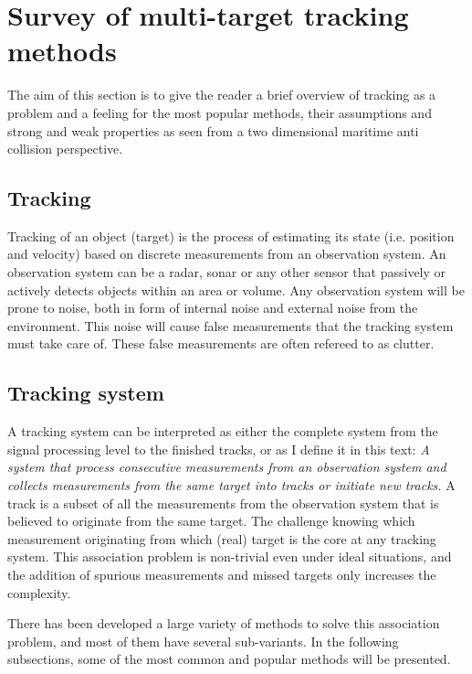 
\section{Survey of multi-target tracking methods}
\label{sec:survey}
The aim of this section is to give the reader a brief overview of tracking as a problem and a feeling for the most popular methods, their assumptions and strong and weak properties as seen from a two dimensional maritime anti collision perspective.

\subsection{Tracking}
Tracking of an object (\gls{target}) is the process of estimating its state (i.e. position and velocity) based on discrete \glspl{measurement} from an observation system. An observation system can be a \gls{radar}, sonar or any other sensor that passively or actively detects objects within an area or volume. Any observation system will be prone to noise, both in form of internal noise and external noise from the environment. This noise will cause false \glspl{measurement} that the tracking system must take care of. These false \glspl{measurement} are often refereed to as \gls{clutter}. 

\subsection{Tracking system}
A tracking system can be interpreted as either the complete system from the signal processing level to the finished tracks, or as I define it in this text: \emph{A system that process consecutive \glspl{measurement} from an observation system and collects \glspl{measurement} from the same \gls{target} into tracks or initiate new tracks.} A track is a subset of all the \glspl{measurement} from the observation system that is believed to originate from the same \gls{target}. The challenge knowing which \gls{measurement} originating from which (real) \gls{target} is the core at any tracking system. This association problem is non-trivial even under ideal situations, and the addition of spurious \glspl{measurement} and missed \glspl{target} only increases the complexity.

There has been developed a large variety of methods to solve this association problem, and most of them have several sub-variants. In the following subsections, some of the most common and popular methods will be presented.

